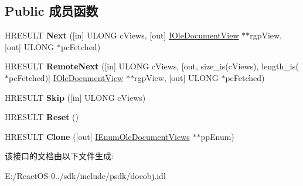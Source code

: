 \subsection*{Public 成员函数}
\begin{DoxyCompactItemize}
\item 
\mbox{\label{interface_i_enum_ole_document_views_aee77021800e046b2b0f62e9ab08697b5}} 
H\+R\+E\+S\+U\+LT {\bfseries Next} (\mbox{[}in\mbox{]} U\+L\+O\+NG c\+Views, \mbox{[}out\mbox{]} \hyperlink{interface_i_ole_document_view}{I\+Ole\+Document\+View} $\ast$$\ast$rgp\+View, \mbox{[}out\mbox{]} U\+L\+O\+NG $\ast$pc\+Fetched)
\item 
\mbox{\label{interface_i_enum_ole_document_views_a7e83f360cabfa4b205d3bd80c9960d27}} 
H\+R\+E\+S\+U\+LT {\bfseries Remote\+Next} (\mbox{[}in\mbox{]} U\+L\+O\+NG c\+Views, \mbox{[}out, size\+\_\+is(c\+Views), length\+\_\+is($\ast$pc\+Fetched)\mbox{]} \hyperlink{interface_i_ole_document_view}{I\+Ole\+Document\+View} $\ast$$\ast$rgp\+View, \mbox{[}out\mbox{]} U\+L\+O\+NG $\ast$pc\+Fetched)
\item 
\mbox{\label{interface_i_enum_ole_document_views_a0e76a0a93c4913252140923e0d64b1ef}} 
H\+R\+E\+S\+U\+LT {\bfseries Skip} (\mbox{[}in\mbox{]} U\+L\+O\+NG c\+Views)
\item 
\mbox{\label{interface_i_enum_ole_document_views_a1cf1c1fe0dfa5063e18224e028dc2d19}} 
H\+R\+E\+S\+U\+LT {\bfseries Reset} ()
\item 
\mbox{\label{interface_i_enum_ole_document_views_ad8bd2415c95c7f7283d73e51b5a06e1c}} 
H\+R\+E\+S\+U\+LT {\bfseries Clone} (\mbox{[}out\mbox{]} \hyperlink{interface_i_enum_ole_document_views}{I\+Enum\+Ole\+Document\+Views} $\ast$$\ast$pp\+Enum)
\end{DoxyCompactItemize}


该接口的文档由以下文件生成\+:\begin{DoxyCompactItemize}
\item 
E\+:/\+React\+O\+S-\/0../sdk/include/psdk/docobj.\+idl\end{DoxyCompactItemize}
